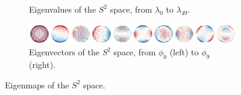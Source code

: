 \documentclass{article}
\begin{document}
\begin{figure}[h!] 
    \centering
    \begin{subfigure}[b]{0.9\textwidth}
        \centering
        \caption{Eigenvalues of the $S^2$ space, from $\lambda_0$ to $\lambda_{49}$.}
    \end{subfigure}
    \hfill
    \begin{subfigure}[b]{\textwidth}
        \centering
        \includegraphics[width=\textwidth]{Images/s2_eigenvecs.png}
        \caption{Eigenvectors of the $S^2$ space, from $\phi_0$ (left) to $\phi_9$ (right).}
    \end{subfigure}
    \caption{Eigenmaps of the $S^2$ space.}
    \label{fig:s2_eigenmaps}
\end{figure}
\end{document}
